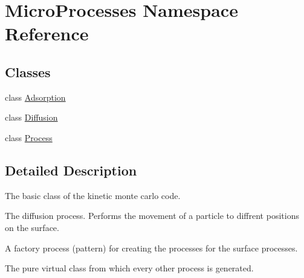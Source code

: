 \hypertarget{namespaceMicroProcesses}{}\section{Micro\+Processes Namespace Reference}
\label{namespaceMicroProcesses}
\subsection*{Classes}
\begin{DoxyCompactItemize}
\item 
class \mbox{\hyperlink{classMicroProcesses_1_1Adsorption}{Adsorption}}
\item 
class \mbox{\hyperlink{classMicroProcesses_1_1Diffusion}{Diffusion}}
\item 
class \mbox{\hyperlink{classMicroProcesses_1_1Process}{Process}}
\end{DoxyCompactItemize}


\subsection{Detailed Description}
The basic class of the kinetic monte carlo code.

The diffusion process. Performs the movement of a particle to diffrent positions on the surface.

A factory process (pattern) for creating the processes for the surface processes.

The pure virtual class from which every other process is generated. 
